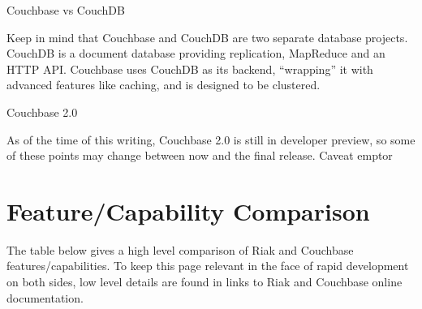 \documentclass[letter]{book}
\newcounter{tab}[chapter]
\begin{document}
Couchbase vs CouchDB

Keep in mind that Couchbase and CouchDB are two separate database projects. CouchDB is a document database providing replication, MapReduce and an HTTP API. Couchbase uses CouchDB as its backend, “wrapping” it with advanced features like caching, and is designed to be clustered.

Couchbase 2.0

As of the time of this writing, Couchbase 2.0 is still in developer preview, so some of these points may change between now and the final release. Caveat emptor

\section{Feature/Capability Comparison}\label{featurecapability-comparison-1}

The table below gives a high level comparison of Riak and Couchbase features/capabilities. To keep this page relevant in the face of rapid development on both sides, low level details are found in links to Riak and Couchbase online documentation.
\end{document}
